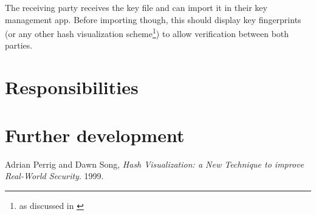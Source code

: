 \documentclass[a4paper,draft]{scrartcl}
\begin{document}
	The receiving party receives the key file and can import it in their key management app. Before importing though,
	this should display key fingerprints (or any other hash visualization scheme\footnote{as discussed in \cite{perrig99}})
	to allow verification between both parties.
	
\section{Responsibilities}
	
\section{Further development}

\begin{thebibliography}{9}
		Adrian Perrig and Dawn Song,
		{\em Hash Visualization: a New Technique to improve Real-World Security}.
		1999.
\end{thebibliography}
\end{document}
